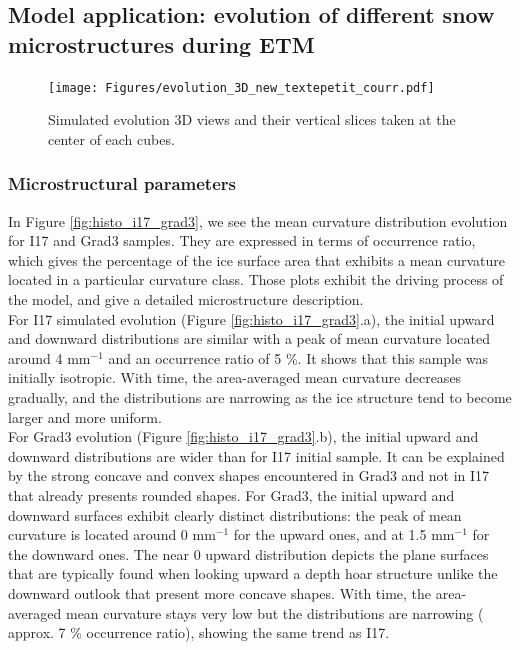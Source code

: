 \documentclass[draft,ms]{agujournal2019}
\begin{document}
\subsection{Model application: evolution of different snow microstructures during ETM}
\begin{figure}
    \centering
    \texttt{[image: Figures/evolution\_3D\_new\_textepetit\_courr.pdf]}
    \caption{Simulated evolution 3D views and their vertical slices taken at the center of each cubes.}
    \label{fig:evolutions_3D}
\end{figure}
\subsubsection{Microstructural parameters}

In Figure \ref{fig:histo_i17_grad3}, we see the mean curvature distribution evolution for I17 and Grad3 samples. They are expressed in terms of occurrence ratio, which gives the percentage of the ice surface area that exhibits a mean curvature located in a particular curvature class. Those plots exhibit the driving process of the model, and give a detailed microstructure description.\\
For I17 simulated evolution (Figure \ref{fig:histo_i17_grad3}.a), the initial upward and downward distributions are similar with a peak of mean curvature located around 4 mm$^{-1}$ and an occurrence ratio of 5 \%. It shows that this sample was initially isotropic. With time, the area-averaged mean curvature decreases gradually, and the distributions are narrowing as the ice structure tend to become larger and more uniform.\\
For Grad3 evolution (Figure \ref{fig:histo_i17_grad3}.b), the initial upward and downward distributions are wider than for I17 initial sample. It can be explained by the strong concave and convex shapes encountered in Grad3 and not in I17 that already presents rounded shapes. For Grad3, the initial upward and downward surfaces exhibit clearly distinct distributions: the peak of mean curvature is located around 0 mm$^{-1}$ for the upward ones, and at 1.5 mm$^{-1}$ for the downward ones. The near 0 upward distribution depicts the plane surfaces that are typically found when looking upward a depth hoar structure unlike the downward outlook that present more concave shapes. With time, the area-averaged mean curvature stays very low but the distributions are narrowing ( approx. 7 \% occurrence ratio), showing the same trend as I17.\\
\end{document}
